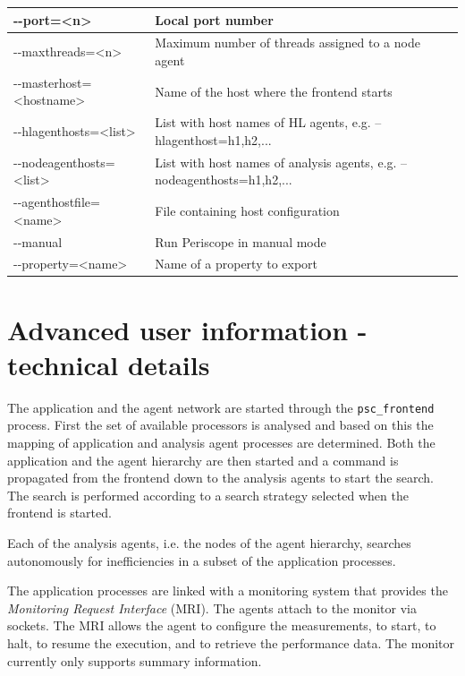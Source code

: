 \documentclass[11pt,oneside,a4paper]{book}
\begin{document}
\begin{center}
\begin{longtable}{|p{5cm}|p{7cm}|}
   -{}-port=\textless n\textgreater &
  Local port number\\
  \hline

   -{}-maxthreads=\textless n\textgreater &
  Maximum number of threads assigned to a node agent\\
  \hline

   -{}-masterhost=\textless hostname\textgreater &
 Name of the host where the frontend starts\\
  \hline

   -{}-hlagenthosts=\textless list\textgreater &
  List with host names of HL agents, e.g. --hlagenthost=h1,h2,...\\
  \hline

  -{}-nodeagenthosts=\textless list\textgreater &
  List with host names of analysis agents, e.g. --nodeagenthosts=h1,h2,...\\
  \hline

  -{}-agenthostfile=\textless name\textgreater &
  File containing host configuration\\
  \hline

  -{}-manual &
  Run Periscope in manual mode\\
  \hline

  -{}-property=\textless name\textgreater &
  Name of a property to export\\
  \hline
 \end{longtable}
\end{center}

\chapter{Advanced user information - technical details}
The application and the agent network are started through the \texttt{psc\_frontend} process. First the set of available processors is analysed and based on this the mapping of application and analysis agent processes are determined. Both the application and the agent hierarchy are then started and a command is propagated from the frontend down to the analysis agents to start the search. The search is performed according to a search strategy selected when the frontend is started.

Each of the analysis agents, i.e. the nodes of the agent hierarchy, searches autonomously for inefficiencies in a subset of the application processes.

The application processes are linked with a monitoring system that provides the \textit{Monitoring Request Interface} (MRI). The agents attach to the monitor via sockets. The MRI allows the agent to configure the measurements, to start, to halt, to resume the execution, and to retrieve the performance data. The monitor currently only supports summary information.
\end{document}
